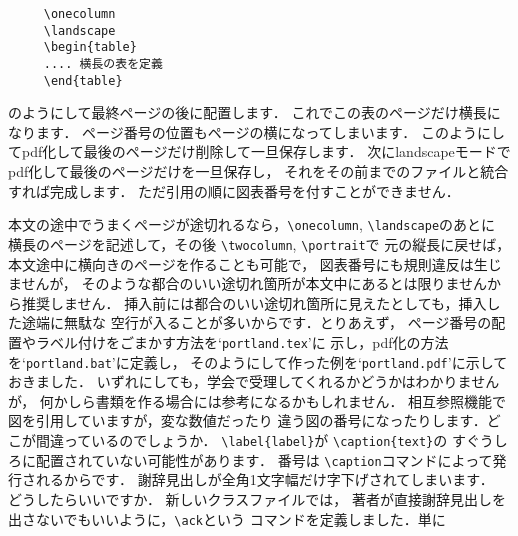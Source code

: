 \documentclass[dvipdfmx,onecolumn]{jsce}  %
\begin{document}
\begin{Enumerate}
\renewcommand{\baselinestretch}{0.75}\small\normalsize
\begin{verbatim}
     \onecolumn
     \landscape
     \begin{table}
     .... 横長の表を定義
     \end{table}
\end{verbatim}
\renewcommand{\baselinestretch}{1}\small\normalsize
のようにして最終ページの後に配置します．
これでこの表のページだけ横長になります．
ページ番号の位置もページの横になってしまいます．
このようにしてpdf化して最後のページだけ削除して一旦保存します．
次にlandscapeモードでpdf化して最後のページだけを一旦保存し，
それをその前までのファイルと統合すれば完成します．
ただ引用の順に図表番号を付すことができません．

本文の途中でうまくページが途切れるなら，\verb+\onecolumn+,
 \verb+\landscape+のあとに
横長のページを記述して，その後 \verb+\twocolumn+, \verb+\portrait+で
元の縦長に戻せば，本文途中に横向きのページを作ることも可能で，
図表番号にも規則違反は生じませんが，
そのような都合のいい途切れ箇所が本文中にあるとは限りませんから推奨しません．
挿入前には都合のいい途切れ箇所に見えたとしても，挿入した途端に無駄な
空行が入ることが多いからです．とりあえず，
ページ番号の配置やラベル付けをごまかす方法を`{\tt portland.tex}'に
示し，pdf化の方法を`{\tt portland.bat}'に定義し，
そのようにして作った例を`{\tt portland.pdf}'に示しておきました．
いずれにしても，学会で受理してくれるかどうかはわかりませんが，
何かしら書類を作る場合には参考になるかもしれません．
%
\Qitem 相互参照機能で図を引用していますが，変な数値だったり
違う図の番号になったりします．どこが間違っているのでしょうか．
\Aitem \verb+\label{label}+が \verb+\caption{text}+の
すぐうしろに配置されていない可能性があります．
番号は \verb+\caption+コマンドによって発行されるからです．
%
\Qitem 謝辞見出しが全角1文字幅だけ字下げされてしまいます．
どうしたらいいですか．
\Aitem 新しいクラスファイルでは，
著者が直接謝辞見出しを出さないでもいいように，\verb+\ack+という
コマンドを定義しました．単に


\end{Enumerate}
\end{document}
